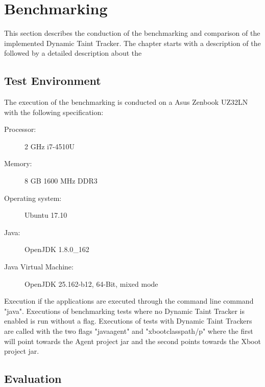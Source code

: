 \chapter{Benchmarking}
This section describes the conduction of the benchmarking and comparison of the implemented Dynamic Taint Tracker. The chapter starts with a description of the \textit{} followed by a detailed description about the \textit{}

\section{Test Environment}
\label{TestEnvironment}
The execution of the benchmarking is conducted on a Asus Zenbook UZ32LN with the following specification:

\hfill
\begin{description}
	\item [Processor:] 2 GHz i7-4510U
	\item [Memory:] 8 GB 1600 MHz DDR3
	\item [Operating system:] Ubuntu 17.10
	\item [Java:] OpenJDK 1.8.0\_162
	\item [Java Virtual Machine:] OpenJDK 25.162-b12, 64-Bit, mixed mode
\end{description}
\hfill

Execution if the applications are executed through the command line command "java". Executions of benchmarking tests where no Dynamic Taint Tracker is enabled is run without a flag. Executions of tests with Dynamic Taint Trackers are called with the two flags "javaagent" and "xbootclasspath/p" where the first will point towards the Agent project jar and the second points towards the Xboot project jar.


\section{Evaluation}
\label{Evaluation}
